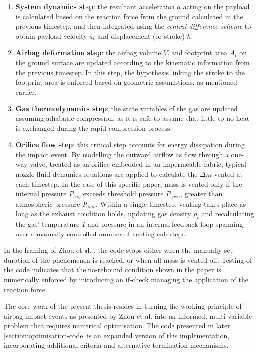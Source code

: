 \begin{enumerate}
  \item \textbf{System dynamics step}: the resultant acceleration $a$ acting on the payload is calculated based on the reaction force from the ground calculated in the previous timestep, and then integrated using the \textit{central difference scheme} to obtain payload velocity $u_t$ and displacement (or stroke) $h$.
  \item \textbf{Airbag deformation step}: the airbag volume $V_t$ and footprint area $A_t$ on the ground surface are updated according to the kinematic information from the previous timestep. In this step, the hypothesis linking the stroke to the footprint area is enforced based on geometric assumptions, as mentioned earlier.
  \item \textbf{Gas thermodynamics step}: the state variables of the gas are updated assuming adiabatic compression, as it is safe to assume that little to no heat is exchanged during the rapid compression process.
  \item \textbf{Orifice flow step}: this critical step accounts for energy dissipation during the impact event. By modelling the outward airflow as flow through a one-way valve, treated as an orifice embedded in an impermeable fabric, typical nozzle fluid dynamics equations are applied to calculate the $\Delta m$ vented at each timestep. In the case of this specific paper, mass is vented only if the internal pressure $P_{bag}$ exceeds threshold pressure $P_{open}$, greater than atmospheric pressure $P_{amb}$. Within a single timestep, venting takes place as long as the exhaust condition holds, updating gas density $\rho_t$ and recalculating the gas' temperature $T$ and pressure in an internal feedback loop spanning over a manually controlled number of venting sub-steps.
\end{enumerate}

In the framing of Zhou et al. \cite{Zhou2019}, the code stops either when the manually-set duration of the phenomenon is reached, or when all mass is vented off. Testing of the code indicates that the no-rebound condition shown in the paper is numerically enforced by introducing an if-check managing the application of the reaction force.

The core work of the present thesis resides in turning the working principle of airbag impact events as presented by Zhou et al. \cite{Zhou2019} into an informed, multi-variable problem that requires numerical optimisation. The code presented in later \cref{section:optimisation-code} is an expanded version of this implementation, incorporating additional criteria and alternative termination mechanisms.


